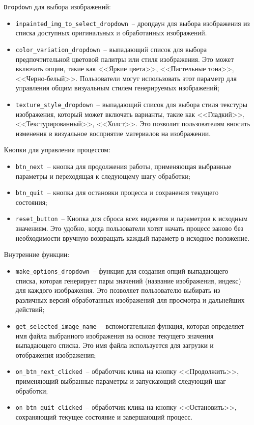 \lstinline{Dropdown} для выбора изображений:

\begin{itemize}
    \item \lstinline{inpainted_img_to_select_dropdown}~-- дропдаун для выбора изображения из списка доступных оригинальных и обработанных изображений.
    \item \lstinline{color_variation_dropdown}~-- выпадающий список для выбора предпочтительной цветовой палитры или стиля изображения. Это может включать опции, такие как <<Яркие цвета>>, <<Пастельные тона>>, <<Черно-белый>>. Пользователи могут использовать этот параметр для управления общим визуальным стилем генерируемых изображений;
    \item \lstinline{texture_style_dropdown}~-- выпадающий список для выбора стиля текстуры изображения, который может включать варианты, такие как <<Гладкий>>, <<Текстурированный>>, <<Холст>>. Это позволит пользователям вносить изменения в визуальное восприятие материалов на изображении.
\end{itemize}

Кнопки для управления процессом:

\begin{itemize}
    \item \lstinline{btn_next}~-- кнопка для продолжения работы, применяющая выбранные параметры и переходящая к следующему шагу обработки;
    \item \lstinline{btn_quit}~-- кнопка для остановки процесса и сохранения текущего состояния;
    \item \lstinline{reset_button}~-- Кнопка для сброса всех виджетов и параметров к исходным значениям. Это удобно, когда пользователи хотят начать процесс заново без необходимости вручную возвращать каждый параметр в исходное положение.
\end{itemize}

Внутренние функции:
\begin{itemize}
    \item \lstinline{make_options_dropdown}~-- функция для создания опций выпадающего списка, которая генерирует пары значений (название изображения, индекс) для каждого изображения. Это позволяет пользователю выбирать из различных версий обработанных изображений для просмотра и дальнейших действий;
    \item \lstinline{get_selected_image_name}~-- вспомогательная функция, которая определяет имя файла выбранного изображения на основе текущего значения выпадающего списка. Это имя файла используется для загрузки и отображения изображения;
    \item \lstinline{on_btn_next_clicked}~-- обработчик клика на кнопку <<Продолжить>>, применяющий выбранные параметры и запускающий следующий шаг обработки;
    \item \lstinline{on_btn_quit_clicked}~-- обработчик клика на кнопку <<Остановить>>, сохраняющий текущее состояние и завершающий процесс.
\end{itemize}

